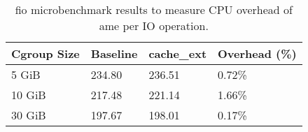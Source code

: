\begin{table}
\centering
\caption{fio microbenchmark results to measure CPU overhead of
ame per IO operation.}
\label{tab:eval-cpu-overhead}
\begin{tabular}{llll}
\toprule
Cgroup Size & Baseline & cache\_ext & Overhead (\%) \\
\midrule
      5 GiB &   234.80 &    236.51 &        0.72\% \\
     10 GiB &   217.48 &    221.14 &        1.66\% \\
     30 GiB &   197.67 &    198.01 &        0.17\% \\
\bottomrule
\end{tabular}
\end{table}
